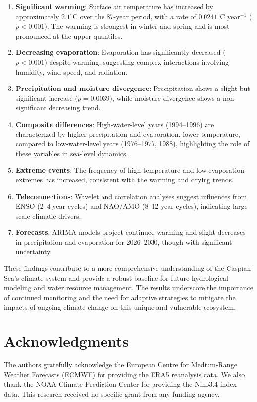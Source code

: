 \documentclass[12pt,a4paper]{article}
\begin{document}
\begin{enumerate}
    \item \textbf{Significant warming}: Surface air temperature has increased by approximately $2.1^\circ$C over the 87-year period, with a rate of $0.0241^\circ$C year$^{-1}$ ($p < 0.001$). The warming is strongest in winter and spring and is most pronounced at the upper quantiles.
    \item \textbf{Decreasing evaporation}: Evaporation has significantly decreased ($p < 0.001$) despite warming, suggesting complex interactions involving humidity, wind speed, and radiation.
    \item \textbf{Precipitation and moisture divergence}: Precipitation shows a slight but significant increase ($p = 0.0039$), while moisture divergence shows a non-significant decreasing trend.
    \item \textbf{Composite differences}: High-water-level years (1994–1996) are characterized by higher precipitation and evaporation, lower temperature, compared to low-water-level years (1976–1977, 1988), highlighting the role of these variables in sea-level dynamics.
    \item \textbf{Extreme events}: The frequency of high-temperature and low-evaporation extremes has increased, consistent with the warming and drying trends.
    \item \textbf{Teleconnections}: Wavelet and correlation analyses suggest influences from ENSO (2–4 year cycles) and NAO/AMO (8–12 year cycles), indicating large-scale climatic drivers.
    \item \textbf{Forecasts}: ARIMA models project continued warming and slight decreases in precipitation and evaporation for 2026–2030, though with significant uncertainty.
\end{enumerate}

These findings contribute to a more comprehensive understanding of the Caspian Sea's climate system and provide a robust baseline for future hydrological modeling and water resource management. The results underscore the importance of continued monitoring and the need for adaptive strategies to mitigate the impacts of ongoing climate change on this unique and vulnerable ecosystem.

\section*{Acknowledgments}
The authors gratefully acknowledge the European Centre for Medium-Range Weather Forecasts (ECMWF) for providing the ERA5 reanalysis data. We also thank the NOAA Climate Prediction Center for providing the Nino3.4 index data. This research received no specific grant from any funding agency.
\end{document}
